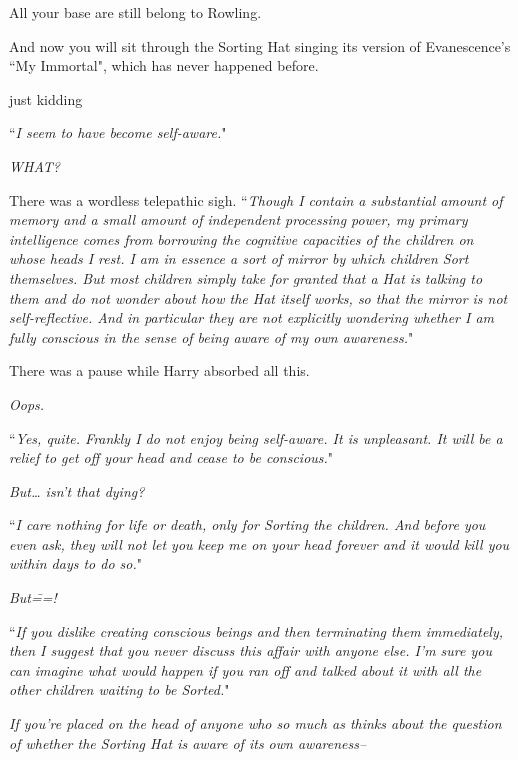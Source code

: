 
\begin{chapterOpeningAuthorNote}
All your base are still belong to Rowling.

And now you will sit through the Sorting Hat singing its version of Evanescence's ``My Immortal", which has never happened before.

just kidding
\end{chapterOpeningAuthorNote}


\hplettrineextrapara
``\emph{I seem to have become self-aware.}"

\emph{WHAT?}

There was a wordless telepathic sigh. ``\emph{Though I contain a substantial amount of memory and a small amount of independent processing power, my primary intelligence comes from borrowing the cognitive capacities of the children on whose heads I rest. I am in essence a sort of mirror by which children Sort \emph{themselves}. But most children simply take for granted that a Hat is talking to them and do not wonder about how the Hat \emph{itself} works, so that the mirror is not \emph{self}-reflective. And in \emph{particular} they are not explicitly wondering whether I am fully conscious in the sense of being aware of my own awareness.}"

There was a pause while Harry absorbed all this.

\emph{Oops.}

``\emph{Yes, quite. Frankly I do not enjoy being self-aware. It is unpleasant. It will be a relief to get off your head and cease to be conscious.}"

\emph{But{\ldots} isn't that dying?}

``\emph{I care nothing for life or death, only for Sorting the children. And before you even ask, they will not let you keep me on your head forever and it would kill you within days to do so.}"

\emph{But\===!}

``\emph{If you dislike creating conscious beings and then terminating them immediately, then I suggest that you never discuss this affair with anyone else. I'm sure you can imagine what would happen if you ran off and talked about it with all the other children waiting to be Sorted.}"

\emph{If you're placed on the head of anyone who so much as \emph{thinks} about the question of whether the Sorting Hat is aware of its own awareness\---}

